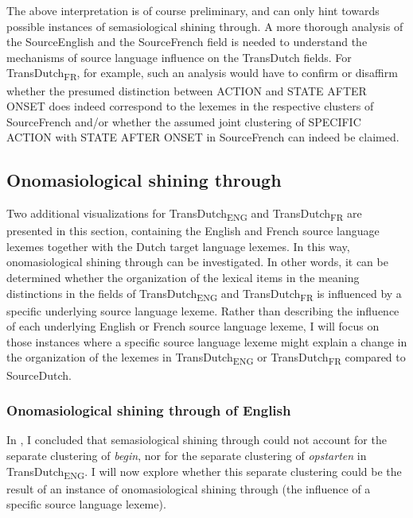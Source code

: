 The above interpretation is of course preliminary, and can only hint towards possible instances of semasiological shining through. A more thorough analysis of the SourceEnglish and the SourceFrench field is needed to understand the mechanisms of source language influence on the TransDutch fields. For TransDutch\textsubscript{FR}, for example, such an analysis would have to confirm or disaffirm whether the presumed distinction between ACTION and STATE AFTER ONSET does indeed correspond to the lexemes in the respective clusters of SourceFrench and\slash or whether the assumed joint clustering of {SPECIFIC} ACTION with STATE AFTER ONSET in SourceFrench can indeed be claimed.

\subsection{Onomasiological shining through}
\label{sec:4.6.2}  
Two additional visualizations for TransDutch\textsubscript{ENG} and TransDutch\textsubscript{FR} are presented in this section, containing the English and French source language lexemes together with the Dutch target language lexemes. In this way, onomasiological shining through can be investigated. In other words, it can be determined whether the organization of the lexical items in the meaning distinctions in the fields of TransDutch\textsubscript{ENG} and TransDutch\textsubscript{FR} is influenced by a specific underlying source language lexeme. Rather than describing the influence of each underlying English or French source language lexeme, I will focus on those instances where a specific source language lexeme might explain a change in the organization of the lexemes in TransDutch\textsubscript{ENG} or TransDutch\textsubscript{FR} compared to SourceDutch.


\subsubsection{Onomasiological shining through of English}
\label{sec:4.6.2.1}  
In , I concluded that semasiological shining through could not account for the separate clustering of \textit{begin}, nor for the separate clustering of \textit{opstarten} in TransDutch\textsubscript{ENG}. I will now explore whether this separate clustering could be the result of an instance of onomasiological shining through (the influence of a specific source language lexeme).

